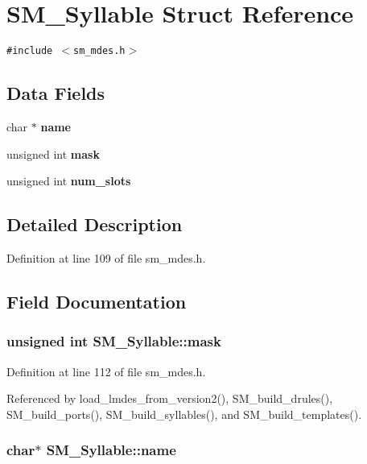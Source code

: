 \section{SM\_\-Syllable Struct Reference}
\label{structSM__Syllable}
{\tt \#include $<$sm\_\-mdes.h$>$}

\subsection*{Data Fields}
\begin{CompactItemize}
\item 
char $\ast$ \bf{name}
\item 
unsigned int \bf{mask}
\item 
unsigned int \bf{num\_\-slots}
\end{CompactItemize}


\subsection{Detailed Description}




Definition at line 109 of file sm\_\-mdes.h.

\subsection{Field Documentation}
\subsubsection{\setlength{\rightskip}{0pt plus 5cm}unsigned int \bf{SM\_\-Syllable::mask}}\label{structSM__Syllable_ab0dbe1aad0176b4ff1237513606cd8f}




Definition at line 112 of file sm\_\-mdes.h.

Referenced by load\_\-lmdes\_\-from\_\-version2(), SM\_\-build\_\-drules(), SM\_\-build\_\-ports(), SM\_\-build\_\-syllables(), and SM\_\-build\_\-templates().
\subsubsection{\setlength{\rightskip}{0pt plus 5cm}char$\ast$ \bf{SM\_\-Syllable::name}}\label{structSM__Syllable_a66ef27d85bdeba77fa25dd9eca90eda}




